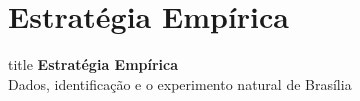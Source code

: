 
\section{Estratégia Empírica}

\begin{frame}[plain]
    \vfill
    \centering
    \begin{beamercolorbox}[sep=12pt,center,shadow=false,rounded=true]{title}
        {\Large\bfseries Estratégia Empírica}\\[6pt]
        {\normalsize Dados, identificação e o experimento natural de Brasília}
    \end{beamercolorbox}
    \vfill
\end{frame}

